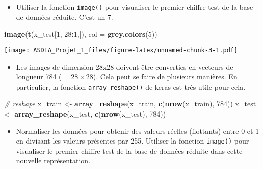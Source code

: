 \documentclass[]{article}
\newenvironment{Shaded}{\begin{snugshade}}{\end{snugshade}}
\newcommand{\KeywordTok}[1]{\textcolor[rgb]{0.13,0.29,0.53}{\textbf{#1}}}
\newcommand{\DataTypeTok}[1]{\textcolor[rgb]{0.13,0.29,0.53}{#1}}
\newcommand{\DecValTok}[1]{\textcolor[rgb]{0.00,0.00,0.81}{#1}}
\newcommand{\StringTok}[1]{\textcolor[rgb]{0.31,0.60,0.02}{#1}}
\newcommand{\CommentTok}[1]{\textcolor[rgb]{0.56,0.35,0.01}{\textit{#1}}}
\newcommand{\OperatorTok}[1]{\textcolor[rgb]{0.81,0.36,0.00}{\textbf{#1}}}
\newcommand{\NormalTok}[1]{#1}
\providecommand{\tightlist}{%
  \setlength{\itemsep}{0pt}\setlength{\parskip}{0pt}}
\begin{document}
\begin{itemize}
\tightlist
\item
  Utiliser la fonction \texttt{image()} pour visualiser le premier
  chiffre test de la base de données réduite. C'est un 7.
\end{itemize}

\begin{Shaded}
\begin{Highlighting}[]
  \KeywordTok{image}\NormalTok{(}\KeywordTok{t}\NormalTok{(x_test[}\DecValTok{1}\NormalTok{, }\DecValTok{28}\OperatorTok{:}\DecValTok{1}\NormalTok{,]), }\DataTypeTok{col =} \KeywordTok{grey.colors}\NormalTok{(}\DecValTok{5}\NormalTok{))}
\end{Highlighting}
\end{Shaded}

\texttt{[image: ASDIA\_Projet\_1\_files/figure-latex/unnamed-chunk-3-1.pdf]}

\begin{itemize}
\tightlist
\item
  Les images de dimension 28x28 doivent être converties en vecteurs de
  longueur 784 (\(= 28 \times 28\)). Cela peut se faire de plusieurs
  manières. En particulier, la fonction \texttt{array\_reshape()} de
  keras est très utile pour cela.
\end{itemize}

\begin{Shaded}
\begin{Highlighting}[]
\CommentTok{# reshape}
\NormalTok{  x_train <-}\StringTok{ }\KeywordTok{array_reshape}\NormalTok{(x_train, }\KeywordTok{c}\NormalTok{(}\KeywordTok{nrow}\NormalTok{(x_train), }\DecValTok{784}\NormalTok{))}
\NormalTok{  x_test <-}\StringTok{ }\KeywordTok{array_reshape}\NormalTok{(x_test, }\KeywordTok{c}\NormalTok{(}\KeywordTok{nrow}\NormalTok{(x_test), }\DecValTok{784}\NormalTok{))}
\end{Highlighting}
\end{Shaded}

\begin{itemize}
\tightlist
\item
  Normaliser les données pour obtenir des valeurs réelles (flottants)
  entre 0 et 1 en divisant les valeurs présentes par 255. Utiliser la
  fonction \texttt{image()} pour visualiser le premier chiffre test de
  la base de données réduite dans cette nouvelle représentation.
\end{itemize}
\end{document}
